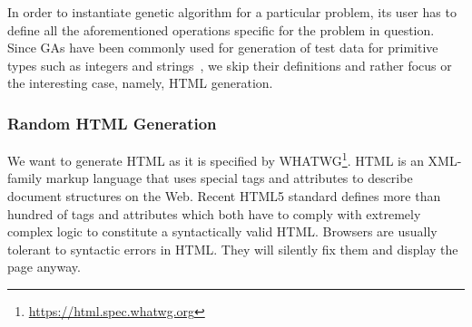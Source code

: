\documentclass[sigconf]{acmart}
\begin{document}
In order to instantiate genetic algorithm for a particular problem, its user has to define all the aforementioned operations specific for the problem in question. Since GAs have been commonly used for generation of test data for primitive types such as integers and strings~\cite{paper_on_search-based_test_case_generation}, we skip their definitions and rather focus or the interesting case, namely, HTML generation.  

\subsubsection{Random HTML Generation}
\label{sub.sub.sec.random.html}

We want to generate HTML as it is specified by WHATWG\footnote{\url{https://html.spec.whatwg.org}}. HTML is an XML-family markup language that uses special tags and attributes to describe document structures on the Web. Recent HTML5 standard defines more than hundred of tags and attributes which both have to comply with extremely complex logic to constitute a syntactically valid HTML. Browsers are usually tolerant to syntactic errors in HTML. They will silently fix them and display the page anyway.
\end{document}
